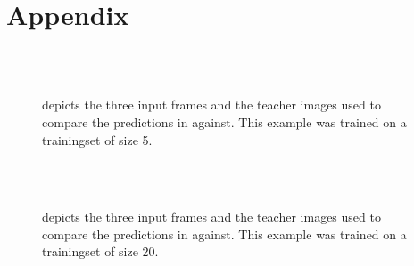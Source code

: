\documentclass[runningheads,a4paper]{llncs}
\begin{document}
\printbibliography
\section{Appendix}

\begin{figure}[htb]
\captionsetup[subfigure]{width=0.2\textwidth}
 \advance\leftskip-4cm
  \ \subfloat[\label{label-1}]{} \\[\topskip]
  \ \subfloat[\label{label-2}]{}
  \caption{ \protect{} depicts the three input frames and the teacher images used to compare the predictions in \protect{} against. This example was trained on a trainingset of size 5.}
  \label{fig:set5}
\end{figure}
\begin{figure}[htb]
\captionsetup[subfigure]{width=0.2\textwidth}
 \advance\leftskip-4cm
  \ \subfloat[\label{label-1}]{} \\[\topskip]
  \ \subfloat[\label{label-2}]{}
  \caption{ \protect{} depicts the three input frames and the teacher images used to compare the predictions in \protect{} against. This example was trained on a trainingset of size 20.}
  \label{fig:set20}
\end{figure}
\end{document}
